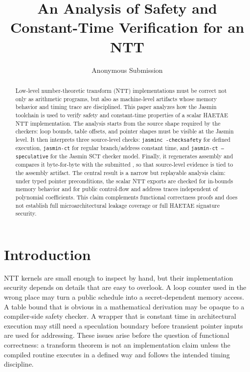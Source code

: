 \documentclass[10pt,twocolumn]{article}
\title{\vspace{-0.8em}An Analysis of \jasmin{} Safety and Constant-Time Verification for an NTT}
\author{Anonymous Submission}
\date{}
\newcommand{\haetae}{HAETAE}
\newcommand{\jasmin}{Jasmin}
\begin{document}
\maketitle
\vspace{-1.1em}

\begin{abstract}
Low-level number-theoretic transform (NTT) implementations must be correct not
only as arithmetic programs, but also as machine-level artifacts whose memory
behavior and timing trace are disciplined.  This paper analyzes how the
\jasmin{} toolchain is used to verify safety and constant-time properties of a
scalar \haetae{} NTT implementation.  The analysis starts from the source shape
required by the checkers: loop bounds, table offsets, and pointer shapes must be
visible at the \jasmin{} level.  It then interprets three source-level checks:
\texttt{jasminc -checksafety} for defined execution, \texttt{jasmin-ct} for
regular branch/address constant time, and \texttt{jasmin-ct --speculative} for
the \jasmin{} SCT checker model.  Finally, it regenerates assembly and compares
it byte-for-byte with the submitted , so that source-level
evidence is tied to the assembly artifact.  The central result is a narrow but
replayable analysis claim: under typed pointer preconditions, the scalar NTT
exports are checked for in-bounds memory behavior and for public control-flow
and address traces independent of polynomial coefficients.  This claim
complements functional correctness proofs and does not establish full
microarchitectural leakage coverage or full \haetae{} signature security.
\end{abstract}

\section{Introduction}

NTT kernels are small enough to inspect by hand, but their implementation
security depends on details that are easy to overlook.  A loop counter used in
the wrong place may turn a public schedule into a secret-dependent memory
access.  A table bound that is obvious in a mathematical derivation may be
opaque to a compiler-side safety checker.  A wrapper that is constant time in
architectural execution may still need a speculation boundary before transient
pointer inputs are used for addressing.  These issues arise before the question
of functional correctness: a transform theorem is not an implementation claim
unless the compiled routine executes in a defined way and follows the intended
timing discipline.
\end{document}
